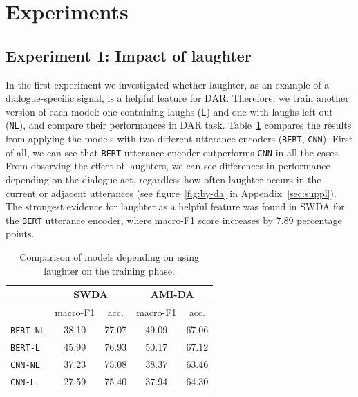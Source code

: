 \documentclass[11pt,a4paper]{article}
\begin{document}
\section{Experiments}
\subsection{Experiment 1: Impact of laughter} \label{sec:experiment1}   %
In the first experiment we investigated whether laughter, as an example of a dialogue-specific signal, is a helpful feature for DAR.
Therefore, we train another version of each model: one containing laughs (\texttt{L}) and one with laughs left out (\texttt{NL}), and compare their performances in DAR task.
Table~\ref{table:laughter-total-acc} compares the results from applying the models with two different utterance encoders (\texttt{BERT}, \texttt{CNN}).
First of all, we can see that \texttt{BERT} utterance encoder outperforms \texttt{CNN} in all the cases.
From observing the effect of laughters, we can see differences in performance depending on the dialogue act, regardless how often laughter occurs in the current or adjacent utterances (see figure~\ref{fig:by-da} in Appendix~\ref{sec:suppl}).
The strongest evidence for laughter as a helpful feature was found in SWDA for the \texttt{BERT} utterance encoder, where macro-F1 score increases by 7.89 percentage points.

\begin{table}
  \centering
  \begin{tabular}{@{}lcccc@{}}
    \toprule
                      & \multicolumn{2}{c}{SWDA} & \multicolumn{2}{c}{AMI-DA} \\ \midrule
                      & macro-F1 & acc. & macro-F1 & acc.       \\ 
    \texttt{BERT-NL}  & 38.10 & 77.07 & 49.09 & 67.06       \\ 
    \texttt{BERT-L}   & 45.99 & 76.93 & 50.17 & 67.12       \\ \midrule
    \texttt{CNN-NL}   & 37.23 & 75.08 & 38.37 & 63.46        \\
    \texttt{CNN-L}    & 27.59 & 75.40 & 37.94 & 64.30        \\ \bottomrule
    
  \end{tabular}
  \caption{Comparison of models depending on using laughter on the training phase. }
  \label{table:laughter-total-acc}
\end{table}
\end{document}
